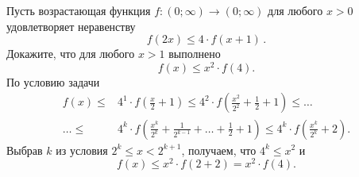 \problem
Пусть возрастающая функция $f \colon (0; \infty) \to (0; \infty)$ для любого
$x > 0$ удовлетворяет неравенству
\[
    f(2 x) \leq 4 \cdot f(x + 1)
\, . \]
Докажите, что для любого $x > 1$ выполнено
\[
    f(x) \leq x^2 \cdot f(4)
.\]
\solution
По условию задачи
\begin{align*}
    f(x)
\leq{}&
    4^1 \cdot f\left( \frac{x}{2} + 1 \right)
\leq
    4^2 \cdot f\left( \frac{x^2}{2^2} + \frac{1}{2} + 1 \right)
\leq\ldots\\\ldots\leq{}&
    4^k
    \cdot
    f\left(
        \frac{x^k}{2^k} + \frac{1}{2^{k-1}} + \ldots + \frac{1}{2} + 1
    \right)
\leq
    4^k \cdot f\left( \frac{x^k}{2^k} + 2 \right)
.\end{align*}
Выбрав $k$ из условия $2^k \leq x < 2^{k + 1}$, получаем, что $4^k \leq x^2$ и
\[
    f(x) \leq x^2 \cdot f(2 + 2) = x^2 \cdot f(4)
.\]
\endproblem
